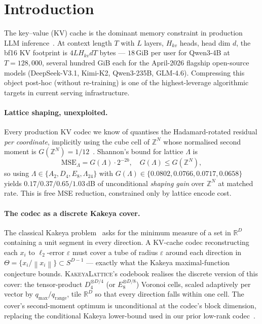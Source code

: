 \documentclass[10pt,a4paper]{article}
\theoremstyle{definition}
\theoremstyle{plain}
\newcommand{\R}{\mathbb{R}}
\newcommand{\Z}{\mathbb{Z}}
\newcommand{\norm}[1]{\left\lVert#1\right\rVert}
\begin{document}
\section{Introduction}
\label{sec:intro}

The key--value (KV) cache is the dominant memory constraint in
production LLM inference~\cite{h2o,scissorhands,deepseekv3}. At
context length $T$ with $L$ layers, $H_{kv}$ heads, head dim $d$,
the bf16 KV footprint is $4LH_{kv}dT$ bytes --- $18$\,GiB per user
for Qwen3-4B at $T=128{,}000$, several hundred GiB each for the
April-2026 flagship open-source models (DeepSeek-V3.1, Kimi-K2,
Qwen3-235B, GLM-4.6). Compressing this object post-hoc (without
re-training) is one of the highest-leverage algorithmic targets in
current serving infrastructure.

\paragraph{Lattice shaping, unexploited.}
Every production KV codec we know of quantises the
Hadamard-rotated residual \emph{per coordinate}, implicitly using
the cube cell of $\Z^N$ whose normalised second moment is
$G(\Z^N)=1/12$~\cite{zamir-feder,conway-sloane-book}. Shannon's
bound for lattice $\Lambda$ is
\begin{equation}
  \label{eq:shaping-gap}
  \text{MSE}_\Lambda = G(\Lambda)\cdot 2^{-2b}, \quad G(\Lambda)\leq G(\Z^N),
\end{equation}
so using $\Lambda \in \{A_2, D_4, E_8, \Lambda_{24}\}$ with
$G(\Lambda)\in\{0.0802, 0.0766, 0.0717, 0.0658\}$ yields
$0.17/0.37/0.65/1.03\,$dB of unconditional \emph{shaping gain}
over $\Z^N$ at matched rate. This is free
MSE reduction, constrained only by lattice encode cost.

\paragraph{The codec as a discrete Kakeya cover.}
\label{sec:intro-kakeya}
The classical Kakeya
problem~\cite{kakeya-problem,besicovitch-1919,wolff-kakeya,tao-kakeya-survey,dvir-finite-field,wang-zahl}
asks for the minimum measure of a set in $\R^D$ containing a unit
segment in every direction. A KV-cache codec reconstructing each
$x_i$ to $\ell_2$-error $\varepsilon$ must cover a tube of radius
$\varepsilon$ around each direction in
$\Theta=\{x_i/\norm{x_i}\}\subset S^{D-1}$ --- exactly what the
Kakeya maximal-function conjecture bounds.
\textsc{KakeyaLattice}'s codebook realises the discrete version of
this cover: the tensor-product $D_4^{\otimes D/4}$ (or
$E_8^{\otimes D/8}$) Voronoi cells, scaled adaptively per vector
by $q_\mathrm{max}/q_\mathrm{range}$, tile $\R^D$ so that every
direction falls within one cell. The cover's second-moment
optimum is unconditional at the codec's block dimension,
replacing the conditional Kakeya lower-bound used in our prior
low-rank codec~\cite{kakeya-v13-paper}.
\end{document}
